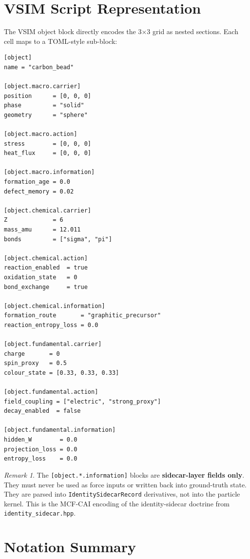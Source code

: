 \documentclass[11pt, a4paper, oneside]{article}
\theoremstyle{definition}
\theoremstyle{plain}
\theoremstyle{remark}
\newtheorem{remark}{Remark}[section]
\begin{document}
\section{VSIM Script Representation}

The VSIM object block directly encodes the 3$\times$3 grid as nested sections.
Each cell maps to a TOML-style sub-block:

\begin{verbatim}
[object]
name = "carbon_bead"

[object.macro.carrier]
position      = [0, 0, 0]
phase         = "solid"
geometry      = "sphere"

[object.macro.action]
stress        = [0, 0, 0]
heat_flux     = [0, 0, 0]

[object.macro.information]
formation_age = 0.0
defect_memory = 0.02

[object.chemical.carrier]
Z             = 6
mass_amu      = 12.011
bonds         = ["sigma", "pi"]

[object.chemical.action]
reaction_enabled  = true
oxidation_state   = 0
bond_exchange     = true

[object.chemical.information]
formation_route       = "graphitic_precursor"
reaction_entropy_loss = 0.0

[object.fundamental.carrier]
charge       = 0
spin_proxy   = 0.5
colour_state = [0.33, 0.33, 0.33]

[object.fundamental.action]
field_coupling = ["electric", "strong_proxy"]
decay_enabled  = false

[object.fundamental.information]
hidden_W        = 0.0
projection_loss = 0.0
entropy_loss    = 0.0
\end{verbatim}

\begin{remark}
  The \texttt{[object.*.information]} blocks are \textbf{sidecar-layer fields only}.
  They must never be used as force inputs or written back into ground-truth state.
  They are parsed into \texttt{IdentitySidecarRecord} derivatives, not into the
  particle kernel. This is the MCF-CAI encoding of the identity-sidecar doctrine
  from \texttt{identity\_sidecar.hpp}.
\end{remark}

\section{Notation Summary}
\end{document}
